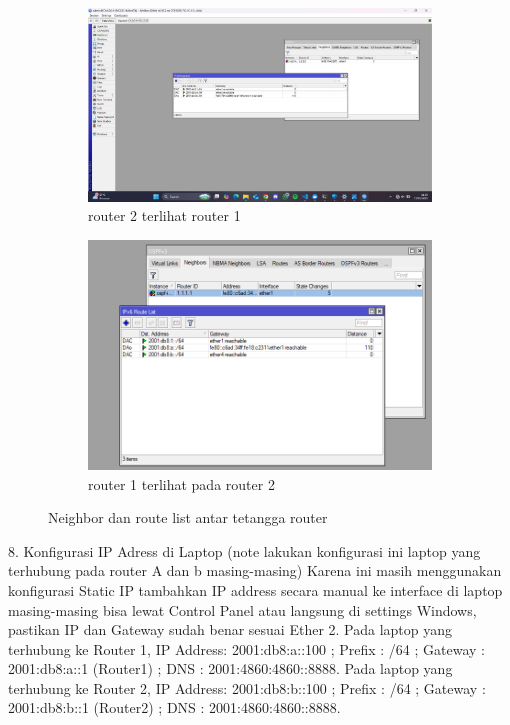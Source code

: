 \begin{figure}[H]
    \centering
    \begin{subfigure}[b]{0.3\linewidth}
      \centering
      \includegraphics[width=\linewidth]{image/dinamis8.jpg}
      \caption{router 2 terlihat router 1}
    \end{subfigure}
    \hspace{1cm}
    \begin{subfigure}[b]{0.3\linewidth}
      \centering
      \includegraphics[width=\linewidth]{image/dinamis7.png}
      \caption{router 1 terlihat pada router 2}
    \end{subfigure}
    \caption{Neighbor dan route list antar tetangga router}
\end{figure}
8. Konfigurasi IP Adress di Laptop (note lakukan konfigurasi ini laptop yang terhubung pada router A dan b masing-masing) Karena ini masih menggunakan konfigurasi Static IP tambahkan IP address secara manual ke interface di laptop masing-masing bisa lewat Control Panel atau langsung di settings Windows, pastikan IP dan Gateway sudah benar sesuai Ether 2. Pada laptop yang terhubung ke Router 1, IP Address: 2001:db8:a::100 ; Prefix : /64 ; Gateway : 2001:db8:a::1 (Router1) ; DNS : 2001:4860:4860::8888. Pada laptop yang terhubung ke Router 2, IP Address: 2001:db8:b::100 ; Prefix : /64 ; Gateway : 2001:db8:b::1 (Router2) ; DNS : 2001:4860:4860::8888.
